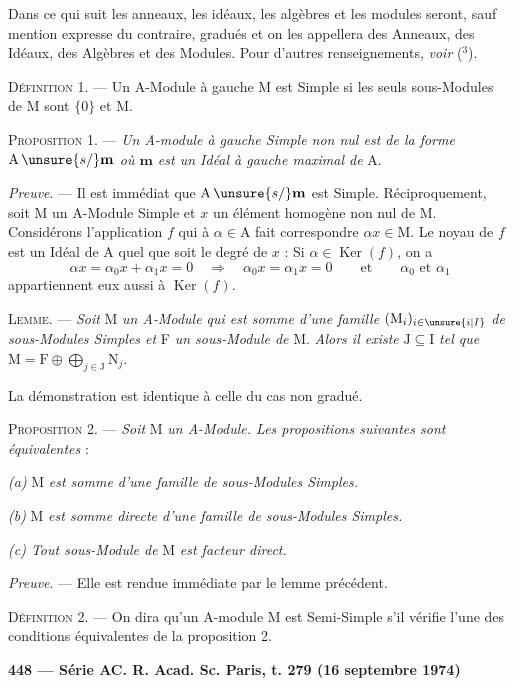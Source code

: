 Dans ce qui suit les anneaux, les idéaux, les algèbres et les modules seront, sauf mention
expresse du contraire, gradués et on les appellera des Anneaux, des Idéaux, des Algèbres
et des Modules. Pour d'autres renseignements, \emph{voir} (${}^3$).

\textsc{Définition 1}. — Un A-Module à gauche M est Simple si les seuls sous-Modules de M
sont $\{0\}$ et M.

\textsc{Proposition 1}. — \emph{Un A-module à gauche Simple non nul est de la forme
$\mathrm A\,\unsure{s/}\mathbf m$ où $\mathbf m$
est un Idéal à gauche maximal de} A.

\emph{Preuve}. — Il est immédiat que $\mathrm A\,\unsure{s/}\mathbf m$ est Simple. Réciproquement, soit M un A-Module
Simple et $x$ un élément homogène non nul de M. Considérons l'application $f$ qui à $\alpha\in\mathrm A$
fait correspondre $\alpha x\in\mathrm M$. Le noyau de $f$ est un Idéal de A quel que soit le degré de $x$ :
Si $\alpha\in\operatorname{Ker}(f)$, on a
\[
\alpha x=\alpha_0x+\alpha_1x=0\quad\Rightarrow\quad\alpha_0x=\alpha_1x=0
\qquad\text{et}\qquad\alpha_0\text{ et }\alpha_1
\]
appartiennent eux aussi à $\operatorname{Ker}(f)$.

\textsc{Lemme}. — \emph{Soit} M \emph{un A-Module qui est somme d'une famille}
$(\mathrm M_i)_{i\in\unsure{i|I}}$ \emph{de sous-Modules
Simples et} F \emph{un sous-Module de} M. \emph{Alors il existe}
$\mathrm J\subseteq\mathrm I$ \emph{tel que}
$\mathrm M=\mathrm F\oplus\bigoplus_{j\in\mathrm J}\mathrm N_j$.

La démonstration est identique à celle du cas non gradué.

\textsc{Proposition 2}. — \emph{Soit} M \emph{un A-Module. Les propositions suivantes sont équivalentes} :

\emph{(a)} M \emph{est somme d'une famille de sous-Modules Simples.}

\emph{(b)} M \emph{est somme directe d'une famille de sous-Modules Simples.}

\emph{(c) Tout sous-Module de} M \emph{est facteur direct.}

\emph{Preuve}. — Elle est rendue immédiate par le lemme précédent.

\textsc{Définition 2}. — On dira qu'un A-module M est Semi-Simple s'il vérifie l'une des conditions
équivalentes de la proposition 2.

\textbf{448 — Série A}\hfill\textbf{C. R. Acad. Sc. Paris, t. 279 (16 septembre 1974)}

